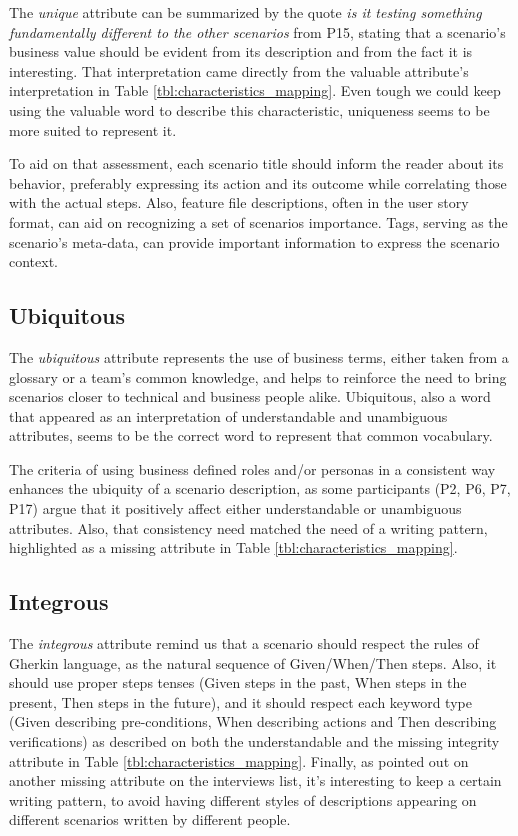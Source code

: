 The \textit{unique} attribute can be summarized by the quote \textit{is it testing something fundamentally different to the other scenarios} from P15, stating that a scenario's business value should be evident from its description and from the fact it is interesting. That interpretation came directly from the valuable attribute's interpretation in Table \ref{tbl:characteristics_mapping}. Even tough we could keep using the valuable word to describe this characteristic, uniqueness seems to be more suited to represent it.

To aid on that assessment, each scenario title should inform the reader about its behavior, preferably expressing its action and its outcome while correlating those with the actual steps. Also, feature file descriptions, often in the user story format, can aid on recognizing a set of scenarios importance. Tags, serving as the scenario's meta-data, can provide important information to express the scenario context. 


\subsection{Ubiquitous}

The \textit{ubiquitous} attribute represents the use of business terms, either taken from a glossary or a team's common knowledge, and helps to reinforce the need to bring scenarios closer to technical and business people alike. Ubiquitous, also a word that appeared as an interpretation of understandable and unambiguous attributes, seems to be the correct word to represent that common vocabulary.

The criteria of using business defined roles and/or personas in a consistent way enhances the ubiquity of a scenario description, as some participants (P2, P6, P7, P17) argue that it positively affect either understandable or unambiguous attributes. Also, that consistency need matched the need of a writing pattern, highlighted as a missing attribute in Table \ref{tbl:characteristics_mapping}.

\subsection{Integrous}

The \textit{integrous} attribute remind us that a scenario should respect the rules of Gherkin language, as the natural sequence of Given/When/Then steps. Also, it should use proper steps tenses (Given steps in the past, When steps in the present, Then steps in the future), and it should respect each keyword type (Given describing pre-conditions, When describing actions and Then describing verifications) as described on both the understandable and the missing integrity attribute in Table \ref{tbl:characteristics_mapping}. Finally, as pointed out on another missing attribute on the interviews list, it's interesting to keep a certain writing pattern, to avoid having different styles of descriptions appearing on different scenarios written by different people.


